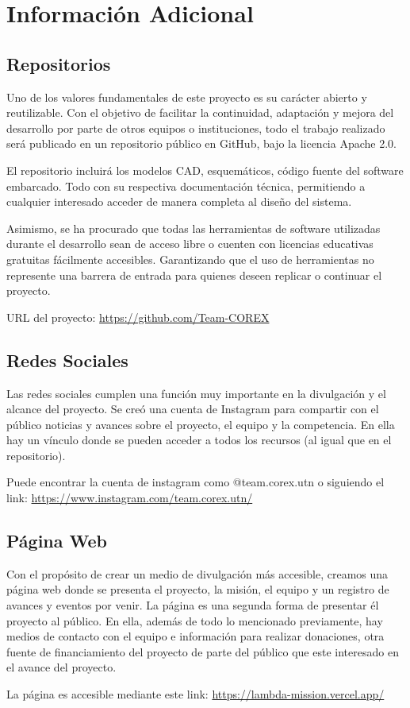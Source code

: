 \chapter{Información Adicional}

\section{Repositorios}

Uno de los valores fundamentales de este proyecto es su carácter abierto y reutilizable.  Con el objetivo de facilitar
la continuidad, adaptación y mejora del desarrollo por parte de otros equipos o instituciones, todo el trabajo realizado
será publicado en un repositorio público en GitHub, bajo la licencia Apache 2.0.

El repositorio incluirá los modelos CAD, esquemáticos, código fuente del software embarcado. Todo con su respectiva
documentación técnica, permitiendo a cualquier interesado acceder de manera completa al diseño del sistema.

Asimismo, se ha procurado que todas las herramientas de software utilizadas durante el desarrollo sean de acceso libre o
cuenten con licencias educativas gratuitas fácilmente accesibles. Garantizando que el uso de herramientas no represente
una barrera de entrada para quienes deseen replicar o continuar el proyecto.

URL del proyecto: \url{https://github.com/Team-COREX}

\section{Redes Sociales}

Las redes sociales cumplen una función muy importante en la divulgación y el alcance del proyecto. Se creó una cuenta de
Instagram para compartir con el público noticias y avances sobre el proyecto, el equipo y la competencia. En ella hay un
vínculo donde se pueden acceder a todos los recursos (al igual que en el repositorio).

Puede encontrar la cuenta de instagram como @team.corex.utn o siguiendo el link:
\url{https://www.instagram.com/team.corex.utn/}

\section{Página Web}
\label{sec:paginaweb}

Con el propósito de crear un medio de divulgación más accesible, creamos una página web donde se presenta el proyecto,
la misión, el equipo y un registro de avances y eventos por venir. La página es una segunda forma de presentar él
proyecto al público. En ella, además de todo lo mencionado previamente, hay medios de contacto con el equipo e
información para realizar donaciones, otra fuente de financiamiento del proyecto de parte del público que este
interesado en el avance del proyecto.

La página es accesible mediante este link: \url{https://lambda-mission.vercel.app/}
